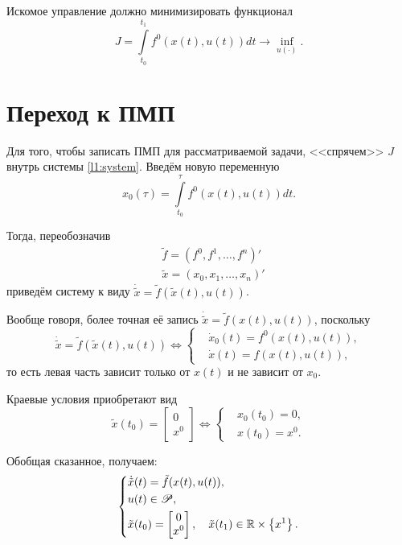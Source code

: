 Искомое управление должно минимизировать функционал
$$
J = \int\limits_{t_0}^{t_1} f^0(x(t), u(t)) dt \to \inf\limits_{u(\cdot)}.
$$

\section*{Переход к ПМП}
Для того, чтобы записать ПМП для рассматриваемой задачи, <<спрячем>> $J$ внутрь системы \eqref{l1:system}. Введём новую переменную
$$
    x_0(\tau) = \int\limits_{t_0}^{\tau} f^0(x(t), u(t)) dt.
$$

Тогда, переобозначив
$$
\begin{aligned}
    & \tilde{f} = (f^0, f^1, \ldots, f^n)' \\
    & \tilde{x} = (x_0, x_1, \ldots, x_n)'
\end{aligned}
$$
приведём систему к виду $\dot{\tilde{x}} = \tilde{f}(\tilde{x}(t), u(t))$.

Вообще говоря, более точная её запись $\dot{\tilde{x}} = \tilde{f}(x(t), u(t))$, поскольку 
$$
\dot{\tilde{x}} = \tilde{f}(\tilde{x}(t), u(t)) \Leftrightarrow
    \left\{
        \begin{aligned}
            & \dot{x}_0(t) = f^0(x(t), u(t)), \\
            & \dot{x}(t) = f(x(t), u(t)),
        \end{aligned}
    \right.
$$
то есть левая часть зависит только от $x(t)$ и не зависит от $x_0$.

Краевые условия приобретают вид
$$
\tilde{x}(t_0) = \begin{bmatrix} 0 \\ x^0 \end{bmatrix}
\Leftrightarrow
\left\{
    \begin{aligned}
        & x_0(t_0) = 0, \\
        & x(t_0) = x^0.
    \end{aligned}
\right.
$$

Обобщая сказанное, получаем:
\begin{equation}\label{l1:pmp_system}
    \left\{
        \begin{aligned}
            & \dot{\tilde{x}}(t) = \tilde{f}(x(t), u(t)), \\
            & u(t) \in \mathscr{P}, \\
            & \tilde{x}(t_0) = \begin{bmatrix} 0 \\ x^0 \end{bmatrix}, \quad \tilde{x}(t_1) \in \mathbb{R} \times \left\{ x^1 \right\}.
        \end{aligned}
    \right.
\end{equation}

